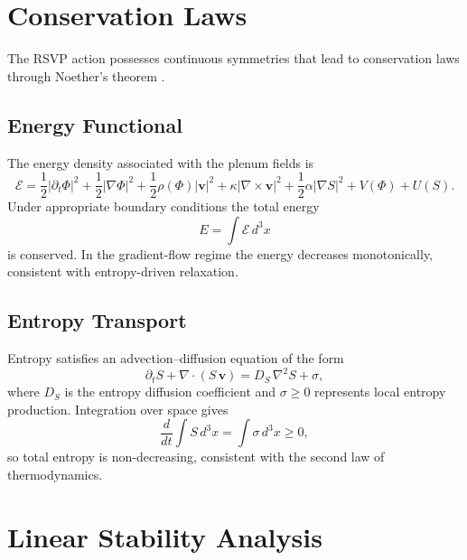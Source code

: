 \documentclass[12pt,a4paper]{article}
\theoremstyle{plain}
\theoremstyle{definition}
\theoremstyle{remark}
\begin{document}
\section{Conservation Laws}

The RSVP action possesses continuous symmetries that lead to
conservation laws through Noether's theorem \cite{Frankel,Nakahara}.

\subsection{Energy Functional}

The energy density associated with the plenum fields is
\begin{equation}
\mathcal{E} =
\frac{1}{2}|\partial_t\Phi|^2
+ \frac{1}{2}|\nabla \Phi|^2
+ \frac{1}{2}\rho(\Phi)|\mathbf{v}|^2
+ \kappa|\nabla \times \mathbf{v}|^2
+ \frac{1}{2}\alpha|\nabla S|^2
+ V(\Phi) + U(S).
\end{equation}
Under appropriate boundary conditions the total energy
\begin{equation}
E = \int \mathcal{E}\, d^3x
\end{equation}
is conserved. In the gradient-flow regime the energy decreases
monotonically, consistent with entropy-driven relaxation.

\subsection{Entropy Transport}

Entropy satisfies an advection--diffusion equation of the form
\begin{equation}
\partial_t S + \nabla \cdot (S\,\mathbf{v}) =
D_S\,\nabla^2 S + \sigma,
\end{equation}
where $D_S$ is the entropy diffusion coefficient and $\sigma \geq 0$
represents local entropy production. Integration over space gives
\begin{equation}
\frac{d}{dt}\int S\,d^3x = \int \sigma\,d^3x \geq 0,
\end{equation}
so total entropy is non-decreasing, consistent with the second law of
thermodynamics.

\section{Linear Stability Analysis}
\end{document}
